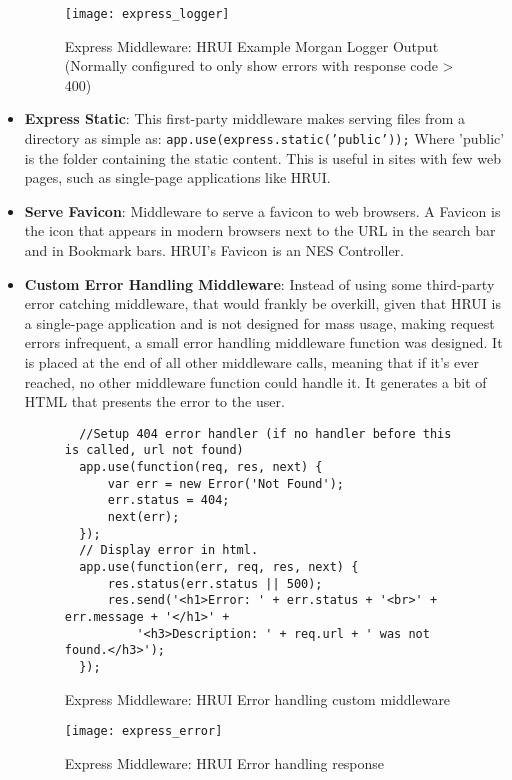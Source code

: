 \begin{itemize}
  \begin{figure}[H]
  \captionsetup{justification=centering}
  \begin{center}
    \texttt{[image: express\_logger]}
  \end{center}
  \caption{Express Middleware: HRUI Example Morgan Logger Output\\(Normally configured to only show errors with response code > 400)}
  \end{figure}
  \item \textbf{Express Static}: This first-party middleware makes serving files from a directory as simple as: \texttt{app.use(express.static('public'));} Where 'public' is the folder containing the static content. This is useful in sites with few web pages, such as single-page applications like HRUI.
  \item \textbf{Serve Favicon}: Middleware to serve a favicon to web browsers. A Favicon is the icon that appears in modern browsers next to the URL in the search bar and in Bookmark bars. HRUI's Favicon is an NES Controller.
  \item \textbf{Custom Error Handling Middleware}: Instead of using some third-party error catching middleware, that would frankly be overkill, given that HRUI is a single-page application and is not designed for mass usage, making request errors infrequent, a small error handling middleware function was designed. It is placed at the end of all other middleware calls, meaning that if it's ever reached, no other middleware function could handle it. It generates a bit of HTML that presents the error to the user.
  \begin{figure}[H]
  \centering
  \captionsetup{justification=centering}
  \begin{verbatim}
  //Setup 404 error handler (if no handler before this is called, url not found)
  app.use(function(req, res, next) {
      var err = new Error('Not Found');
      err.status = 404;
      next(err);
  });
  // Display error in html.
  app.use(function(err, req, res, next) {
      res.status(err.status || 500);
      res.send('<h1>Error: ' + err.status + '<br>' + err.message + '</h1>' +
          '<h3>Description: ' + req.url + ' was not found.</h3>');
  });
  \end{verbatim}
  \caption{Express Middleware: HRUI Error handling custom middleware}
  \end{figure}
  \begin{figure}[H]
  \captionsetup{justification=centering}
  \begin{center}
    \texttt{[image: express\_error]}
  \end{center}
  \caption{Express Middleware: HRUI Error handling response}
  \end{figure}
\end{itemize}
